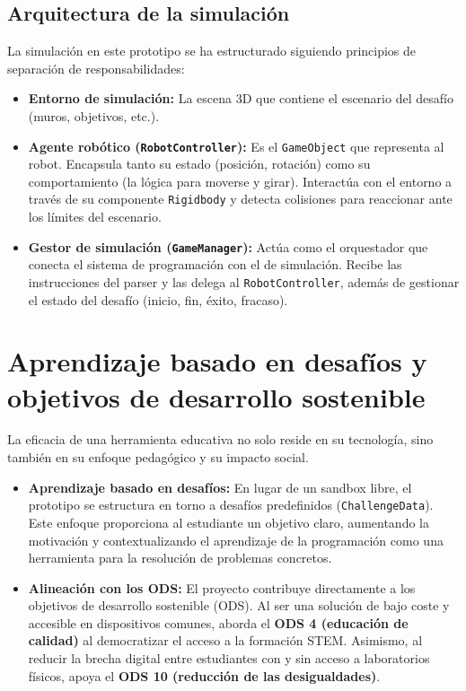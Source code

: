 \subsection{Arquitectura de la simulación}
La simulación en este prototipo se ha estructurado siguiendo principios de separación de responsabilidades:
\begin{itemize}
	\item \textbf{Entorno de simulación:} La escena 3D que contiene el escenario del desafío (muros, objetivos, etc.).
	\item \textbf{Agente robótico (\texttt{RobotController}):} Es el \texttt{GameObject} que representa al robot. Encapsula tanto su estado (posición, rotación) como su comportamiento (la lógica para moverse y girar). Interactúa con el entorno a través de su componente \texttt{Rigidbody} y detecta colisiones para reaccionar ante los límites del escenario.
	\item \textbf{Gestor de simulación (\texttt{GameManager}):} Actúa como el orquestador que conecta el sistema de programación con el de simulación. Recibe las instrucciones del parser y las delega al \texttt{RobotController}, además de gestionar el estado del desafío (inicio, fin, éxito, fracaso).
\end{itemize}



\section{Aprendizaje basado en desafíos y objetivos de desarrollo sostenible}
La eficacia de una herramienta educativa no solo reside en su tecnología, sino también en su enfoque pedagógico y su impacto social.
\begin{itemize}
	\item \textbf{Aprendizaje basado en desafíos:} En lugar de un sandbox libre, el prototipo se estructura en torno a desafíos predefinidos (\texttt{ChallengeData}). Este enfoque proporciona al estudiante un objetivo claro, aumentando la motivación y contextualizando el aprendizaje de la programación como una herramienta para la resolución de problemas concretos.
	
	\item \textbf{Alineación con los ODS:} El proyecto contribuye directamente a los objetivos de desarrollo sostenible (ODS). Al ser una solución de bajo coste y accesible en dispositivos comunes, aborda el \textbf{ODS 4 (educación de calidad)} al democratizar el acceso a la formación STEM. Asimismo, al reducir la brecha digital entre estudiantes con y sin acceso a laboratorios físicos, apoya el \textbf{ODS 10 (reducción de las desigualdades)}.
\end{itemize}
